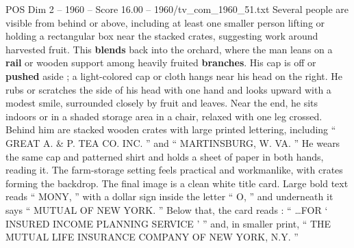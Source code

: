 \begin{textsample}{POS Dim 2 – 1960 – Score 16.00 – 1960/tv\_com\_1960\_51.txt}
Several people are visible from behind or above, including at least one smaller person lifting or holding a rectangular box near the stacked crates, suggesting work around harvested fruit.
This \textbf{blends} back into the orchard, where the man leans on a \textbf{rail} or wooden support among heavily fruited \textbf{branches}.
His cap is off or \textbf{pushed} aside ; a light-colored cap or cloth hangs near his head on the right.
He rubs or scratches the side of his head with one hand and looks upward with a modest smile, surrounded closely by fruit and leaves.
Near the end, he sits indoors or in a shaded storage area in a chair, relaxed with one leg crossed.
Behind him are stacked wooden crates with large printed lettering, including “ GREAT A. \& P.
TEA CO.
INC. ” and “ MARTINSBURG, W.
VA. ” He wears the same cap and patterned shirt and holds a sheet of paper in both hands, reading it.
The farm-storage setting feels practical and workmanlike, with crates forming the backdrop.
The final image is a clean white title card.
Large bold text reads “ MONY, ” with a dollar sign inside the letter “ O, ” and underneath it says “ MUTUAL OF NEW YORK. ” Below that, the card reads : “ …FOR ‘ INSURED INCOME PLANNING SERVICE ’ ” and, in smaller print, “ THE MUTUAL LIFE INSURANCE COMPANY OF NEW YORK, N.Y. ”

\end{textsample}
